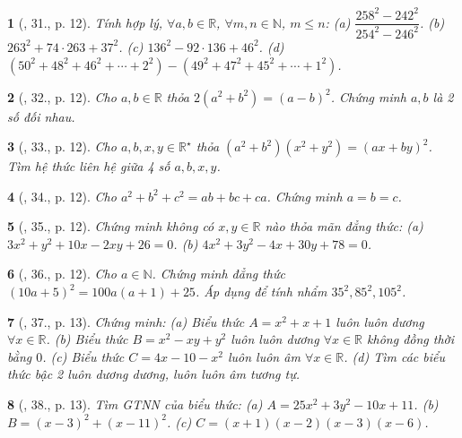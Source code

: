 \documentclass{article}
\newtheorem{baitoan}{}
\begin{document}
\begin{baitoan}[\cite{Tuyen_Toan_8}, 31., p. 12]
	Tính hợp lý, $\forall a,b\in\mathbb{R}$, $\forall m,n\in\mathbb{N}$, $m\le n$: (a) $\dfrac{258^2 - 242^2}{254^2 - 246^2}$. (b) $263^2 + 74\cdot263 + 37^2$. (c) $136^2 - 92\cdot136 + 46^2$. (d) $(50^2 + 48^2 + 46^2 + \cdots + 2^2) - (49^2 + 47^2 + 45^2 + \cdots + 1^2)$.
\end{baitoan}

\begin{baitoan}[\cite{Tuyen_Toan_8}, 32., p. 12]
	Cho $a,b\in\mathbb{R}$ thỏa $2(a^2 + b^2) = (a - b)^2$. Chứng minh $a,b$ là 2 số đối nhau.
\end{baitoan}

\begin{baitoan}[\cite{Tuyen_Toan_8}, 33., p. 12]
	Cho $a,b,x,y\in\mathbb{R}^\star$ thỏa $(a^2 + b^2)(x^2 + y^2) = (ax + by)^2$. Tìm hệ thức liên hệ giữa 4 số $a,b,x,y$.
\end{baitoan}

\begin{baitoan}[\cite{Tuyen_Toan_8}, 34., p. 12]
	Cho $a^2 + b^2 + c^2 = ab + bc + ca$. Chứng minh $a = b = c$.
\end{baitoan}

\begin{baitoan}[\cite{Tuyen_Toan_8}, 35., p. 12]
	Chứng minh không có $x,y\in\mathbb{R}$ nào thỏa mãn đẳng thức: (a) $3x^2 + y^2 + 10x - 2xy + 26 = 0$. (b) $4x^2 + 3y^2 - 4x + 30y + 78 = 0$.
\end{baitoan}

\begin{baitoan}[\cite{Tuyen_Toan_8}, 36., p. 12]
	Cho $a\in\mathbb{N}$. Chứng minh đẳng thức $(10a + 5)^2 = 100a(a + 1) + 25$. Áp dụng để tính nhẩm $35^2,85^2,105^2$.
\end{baitoan}

\begin{baitoan}[\cite{Tuyen_Toan_8}, 37., p. 13]
	Chứng minh: (a) Biểu thức $A = x^2 + x + 1$ luôn luôn dương $\forall x\in\mathbb{R}$. (b) Biểu thức $B = x^2 - xy + y^2$ luôn luôn dương $\forall x\in\mathbb{R}$ không đồng thời bằng $0$. (c) Biểu thức $C = 4x - 10 - x^2$ luôn luôn âm $\forall x\in\mathbb{R}$. (d) Tìm các biểu thức bậc 2 luôn dương dương, luôn luôn âm tương tự.
\end{baitoan}

\begin{baitoan}[\cite{Tuyen_Toan_8}, 38., p. 13]
	Tìm {\rm GTNN} của biểu thức: (a) $A = 25x^2 + 3y^2 - 10x + 11$. (b) $B = (x - 3)^2 + (x - 11)^2$. (c) $C = (x + 1)(x - 2)(x - 3)(x - 6)$.
\end{baitoan}
\end{document}
